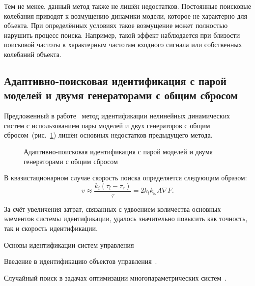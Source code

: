 Тем не менее, данный метод также не лишён недостатков.
Постоянные поисковые колебания приводят к возмущению динамики модели,
которое не характерно для объекта. При определённых условиях
такое возмущение может полностью нарушить процесс поиска.
Например, такой эффект наблюдается при близости поисковой частоты к характерным частотам входного сигнала или
собственных колебаний объекта.




\subsection{Адаптивно-поисковая идентификация с парой моделей и двумя генераторами с общим сбросом} %

Предложенный в работе~\cite{atu_phd_thesis} метод идентификации
нелинейных динамических систем с использованием
пары моделей и двух генераторов с общим сбросом~(рис.~\ref{atu:f:apid2})
лишён основных недостатков предыдущего метода.

\begin{figure}[htb!]
\begin{center}

\end{center}
\caption{Адаптивно-поисковая идентификация с парой моделей и двумя генераторами с общим сбросом}
\label{atu:f:apid2}
\end{figure}


В квазистационарном случае скорость поиска определяется следующим образом:
%
\begin{equation}
\label{atu:eq:vugpk2}
  v
  \approx
  \frac{k_i (\tau_l - \tau_r)}{\tau}
  =
  2 k_i k_\omega A \nabla F .
\end{equation}

За счёт увеличения затрат, связанных с удвоением количества основных элементов системы идентификации,
удалось значительно повысить как точность, так и скорость идентификации.




Основы идентификации систем управления~\cite{eykhoff_id_base,eykhoff_modern_id,gropp_methods_id,deith_method_id_ds,lung_id_sys,seidg_id_su,leondes_modern_tu,nelles_nlsys_id}

Введение в идентификацию объектов управления~\cite{rastr_intro,rastr_adop_complex_sys}.

Случайный поиск в задачах оптимизации многопараметрических систем~\cite{rastr_rand_search,rastr_rand_search_adopt}.

